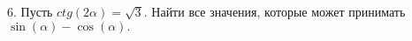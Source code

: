 6. Пусть $ctg(2\alpha)=\sqrt{3}.$ Найти все значения, которые может принимать $\sin(\alpha)-\cos(\alpha).$\\
